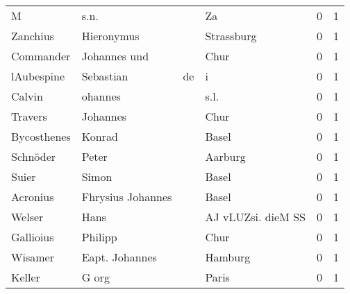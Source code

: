 \begin{center}
\begin{tiny}
\begin{longtabu}{llllrr}
                        M &                               s.n. &             &                                          Za &          0 &         1 \\
                 Zanchius &                         Hieronymus &             &                                  Strassburg &          0 &         1 \\
                Commander &                       Johannes und &             &                                        Chur &          0 &         1 \\
               lAubespine &                          Sebastian &          de &                                           i &          0 &         1 \\
                   Calvin &                            ohannes &             &                                        s.l. &          0 &         1 \\
                  Travers &                           Johannes &             &                                        Chur &          0 &         1 \\
              Bycosthenes &                             Konrad &             &                                       Basel &          0 &         1 \\
                 Schnöder &                              Peter &             &                                     Aarburg &          0 &         1 \\
                    Suier &                              Simon &             &                                       Basel &          0 &         1 \\
                 Acronius &                  Fhrysius Johannes &             &                                       Basel &          0 &         1 \\
                   Welser &                               Hans &             &                          AJ vLUZsi. dieM SS &          0 &         1 \\
                Gallioius &                            Philipp &             &                                        Chur &          0 &         1 \\
                  Wisamer &                     Eapt. Johannes &             &                                     Hamburg &          0 &         1 \\
                   Keller &                              G org &             &                                       Paris &          0 &         1 \\

\end{longtabu}
\end{tiny}
\end{center}
